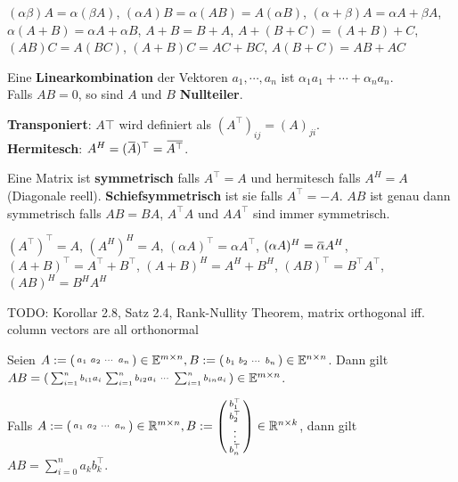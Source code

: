 \documentclass[a4paper,10pt]{article}
\def\R{\mathbb{R}}
\newcommand{\overbar}[1]{\mkern 1.5mu\overline{\mkern-1.5mu#1\mkern-1.5mu}\mkern 1.5mu}
\begin{document}
\begin{subbox}{}
  $(\alpha \beta)A = \alpha(\beta A)$,
  $(\alpha A)B = \alpha(AB) = A(\alpha B)$,
  $(\alpha + \beta)A = \alpha A + \beta A$,
  $\alpha(A + B) = \alpha A + \alpha B$,
  $A + B = B + A$,
  $A + (B + C) = (A + B) + C$,
  $(AB)C = A(BC)$,
  $(A + B)C = AC + BC$,
  $A(B + C) = AB + AC$
\end{subbox}

Eine \textbf{Linearkombination} der Vektoren $a_1, \cdots, a_n$ ist $\alpha_1 a_1 + \cdots + \alpha_n a_n$.\\
Falls $AB = 0$, so sind $A$ und $B$ \textbf{Nullteiler}.\\
\begin{subbox}{}
  \textbf{Transponiert}: $A\top$ wird definiert als $(A^\top)_{ij} = (A)_{ji}$.\\
  \textbf{Hermitesch}: $A^H = (\overbar{A})^\top = \overbar{A^\top}$.
\end{subbox}
Eine Matrix ist \textbf{symmetrisch} falls $A^\top = A$ und hermitesch falls $A^H = A$ (Diagonale reell). \textbf{Schiefsymmetrisch} ist sie falls $A^\top = -A$. $AB$ ist genau dann symmetrisch falls $AB = BA$, $A^\top A$ und $A A^\top$ sind  immer symmetrisch.
\begin{subbox}{}
  $(A^\top)^\top = A$, $(A^H)^H = A$, $(\alpha A)^\top = \alpha A^\top$, $(\alpha A)^H = \overbar{\alpha} A^H$, $(A + B)^\top = A^\top + B^\top$, $(A + B)^H = A^H + B^H$, $(AB)^\top = B^\top A^\top$, $(AB)^H = B^H A^H$
\end{subbox}

TODO: Korollar 2.8, Satz 2.4, Rank-Nullity Theorem, matrix orthogonal iff. column vectors are all orthonormal

\begin{subbox}{}
  Seien $A := \begin{psmallmatrix} a_1 & a_2 & \cdots & a_n \end{psmallmatrix} \in \mathbb{E}^{m \times n}, B := \begin{psmallmatrix} b_1 & b_2 & \cdots & b_n \end{psmallmatrix} \in \mathbb{E}^{n \times n}$. Dann gilt $AB = \begin{psmallmatrix} \sum_{i=1}^n b_{i1} a_i & \sum_{i=1}^n b_{i2} a_i & \cdots & \sum_{i=1}^n b_{in} a_i \end{psmallmatrix} \in \mathbb{E}^{m \times n}$.
\end{subbox}

Falls 
$A := \begin{psmallmatrix}
  a_1 & a_2 & \cdots & a_n\\
\end{psmallmatrix} \in \R^{m \times n}, B := \begin{psmallmatrix}
  b_1^\top \\
  b_2^\top \\
  \vdots \\
  b_n^\top
\end{psmallmatrix} \in \R^{n \times k}$, dann gilt $AB = \sum_{i=0}^n a_k b_k^\top$.
\end{document}
